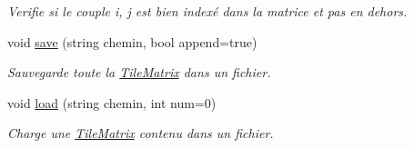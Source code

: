 \begin{DoxyCompactItemize}
\begin{DoxyCompactList}\small\item\em Verifie si le couple i, j est bien indexé dans la matrice et pas en dehors. \end{DoxyCompactList}\item 
void \hyperlink{class_tile_matrix_ae0239badb424adde14ae390b25fcf32d}{save} (string chemin, bool append=true)
\begin{DoxyCompactList}\small\item\em Sauvegarde toute la \hyperlink{class_tile_matrix}{Tile\+Matrix} dans un fichier. \end{DoxyCompactList}\item 
void \hyperlink{class_tile_matrix_ad67296e27a165e8a0e1a2649c890664b}{load} (string chemin, int num=0)
\begin{DoxyCompactList}\small\item\em Charge une \hyperlink{class_tile_matrix}{Tile\+Matrix} contenu dans un fichier. \end{DoxyCompactList}\end{DoxyCompactItemize}
